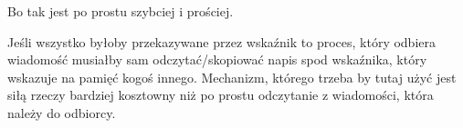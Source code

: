 Bo tak jest po prostu szybciej i prościej.

Jeśli wszystko byłoby przekazywane przez wskaźnik to proces, który odbiera wiadomość musiałby sam odczytać/skopiować napis spod wskaźnika, który wskazuje na pamięć kogoś innego.
Mechanizm, którego trzeba by tutaj użyć jest siłą rzeczy bardziej kosztowny niż po prostu odczytanie z wiadomości, która należy do odbiorcy.
